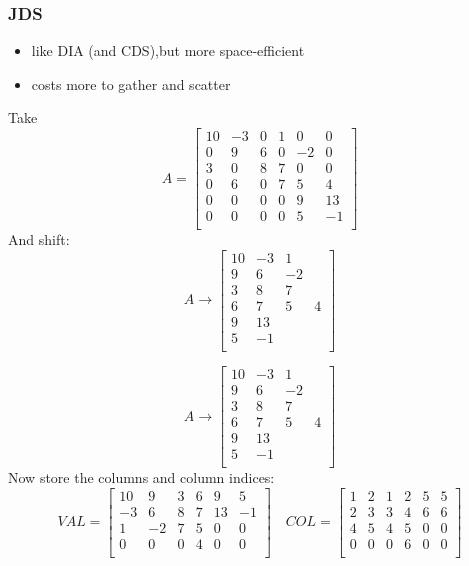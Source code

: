 \documentclass[10pt]{beamer}
\begin{document}
\begin{frame}
\frametitle{JDS}
  \begin{itemize}
    \item like DIA (and CDS),but more space-efficient
    \item costs more to gather and scatter
  \end{itemize}
Take
\begin{equation*}
  A=
\begin{bmatrix}
  10 & -3 & 0 & 1 & 0 & 0\\
0 & 9 & 6 & 0 & -2 & 0\\
3 & 0 & 8 & 7 & 0 & 0\\
0 & 6 & 0 & 7 & 5 & 4\\
0 & 0 & 0 & 0 & 9 & 13\\
0 & 0 & 0 & 0 & 5 & -1\\
\end{bmatrix}
\end{equation*}
And shift:
\begin{equation*}
  A \rightarrow
\begin{bmatrix}
  10 & -3 & 1 & \\
  9 & 6 & -2 & \\
3 & 8 & 7 & \\
6 & 7 & 5 & 4\\
9 & 13 & &\\
5 & -1 & &\\
\end{bmatrix}
\end{equation*}
\end{frame}
\begin{frame}
\begin{equation*}
  A \rightarrow
\begin{bmatrix}
  10 & -3 & 1 & \\
  9 & 6 & -2 & \\
3 & 8 & 7 & \\
6 & 7 & 5 & 4\\
9 & 13 & &\\
5 & -1 & &\\
\end{bmatrix}
\end{equation*}
Now store the columns and column indices:
\begin{equation*}
VAL=
\begin{bmatrix}
10 & 9 & 3 & 6 & 9 & 5 \\
-3 & 6 & 8 & 7 & 13 & -1\\
1 & -2 & 7 & 5 & 0 & 0\\
0 & 0 & 0 & 4 & 0 & 0\\
\end{bmatrix}
\quad
COL=
\begin{bmatrix}
1 & 2 & 1 & 2 & 5 & 5\\
2 & 3 & 3 & 4 & 6 & 6\\
4 & 5 & 4 & 5 & 0 & 0\\
0 & 0 & 0 & 6 & 0 & 0\\
\end{bmatrix}
\end{equation*}

\end{frame}
\end{document}
